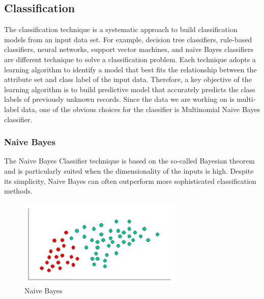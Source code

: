 \documentclass[a4paper]{article}
\begin{document}
\subsection{Classification}
The classification technique is a systematic approach to build classification models from an input data set. For example, decision tree classifiers, rule-based classifiers, neural networks, support vector machines, and naive Bayes classifiers are different technique to solve a classification problem. Each technique adopts a learning algorithm to identify a model that best fits the relationship between the attribute set and class label of the input data. Therefore, a key objective of the learning algorithm is to build predictive model that accurately predicts the class labels of previously unknown records. Since the data we are working on is multi-label data, one of the obvious choices for the classifier is Multinomial Naive Bayes classifier. 

\subsubsection{Naive Bayes}
The Naive Bayes Classifier technique is based on the so-called Bayesian theorem and is particularly suited when the dimensionality of the inputs is high. Despite its simplicity, Naive Bayes can often outperform more sophisticated classification methods.

\begin{figure}[h!]
  \centering
  \includegraphics[width=0.7\textwidth]{NaiveBayes}
  \caption{Naive Bayes}
\end{figure}
\end{document}
